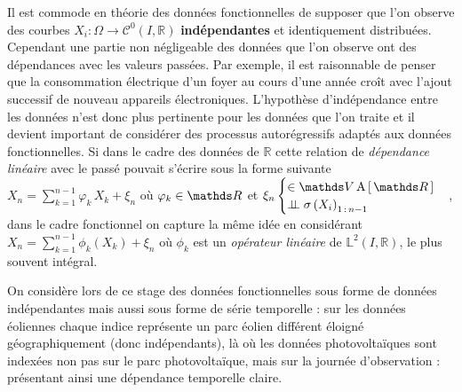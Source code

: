 Il est commode en théorie des données fonctionnelles de supposer que l'on observe des courbes $X_i : \Omega \rightarrow \mathcal C^0(I, \mathds R)$ \textbf{indépendantes} et identiquement distribuées. Cependant une partie non négligeable des données que l'on observe ont des dépendances avec les valeurs passées. 
Par exemple, il est raisonnable de penser que la consommation électrique d'un foyer au cours d'une année croît avec l'ajout successif de nouveau appareils électroniques. 
L'hypothèse d'indépendance entre les données n'est donc plus pertinente pour les données que l'on traite et il devient important de considérer des processus autorégressifs adaptés aux données fonctionnelles.
Si dans le cadre des données de $\mathds R$ cette relation de \emph{dépendance linéaire} avec le passé pouvait s'écrire sous la forme suivante
$X_n = \sum\limits_{k=1}^{n-1} \varphi_k \, X_k + \xi_n$ où $\varphi_k \in \grandR$
et
$\xi_n \begin{cases} \in \mathds V \operatorname{A}\left[ \, \grandR \,\right] \\ \indep \sigma\left( X_i \right)_{1\,: \, n-1}\end{cases}$,
dans le cadre fonctionnel on capture la même idée en considérant
$X_n = \sum\limits_{k=1}^{n-1} \phi_k \left( X_k \right) + \xi_n$ où $\phi_k$
est un \emph{opérateur linéaire} de $\mathds L^2(I, \mathds R)$,
le plus souvent intégral.


On considère lors de ce stage des données fonctionnelles sous forme de données indépendantes mais aussi sous forme de série temporelle : sur les données éoliennes chaque indice représente un parc éolien différent éloigné géographiquement (donc indépendants), là où les données photovoltaïques sont indexées non pas sur le parc photovoltaïque, mais sur la journée d'observation : présentant ainsi une dépendance temporelle claire.



